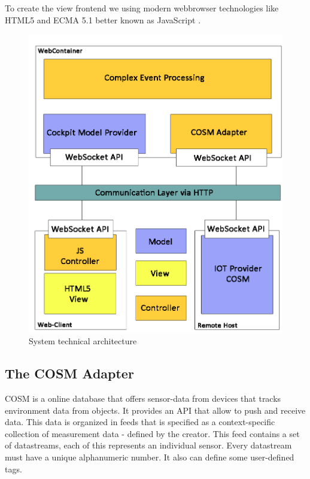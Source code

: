 \documentclass{acm_proc_article-sp}
\begin{document}
To create the view frontend we using modern webbrowser technologies like HTML5\cite{html5} and ECMA 5.1 better known as JavaScript \cite{ecma}.

\begin{figure}[h]
	\begin{center}
		\includegraphics[scale=0.25]{mvc-architecture.png}
		\caption[System technical architecture]{System technical architecture}
		\label{fig:SystemTechnicalArchitecture}
	\end{center}
\end{figure}

\subsection{The COSM Adapter}
COSM is a online database that offers sensor-data from devices that tracks environment data from objects. It provides an API that allow to push and receive data.
This data is organized in feeds that is specified as a context-specific collection of measurement data - defined by the creator. This feed contains a set of datastreams, each of this represents an individual sensor. Every datastream must have a unique alphanumeric number. It also can define some user-defined tags.
\end{document}
